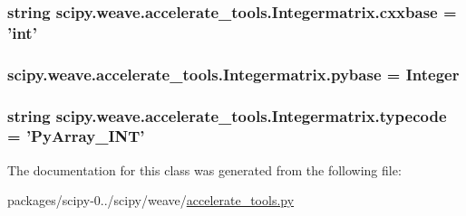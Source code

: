\subsubsection[{cxxbase}]{\setlength{\rightskip}{0pt plus 5cm}string scipy.\+weave.\+accelerate\+\_\+tools.\+Integermatrix.\+cxxbase = 'int'\hspace{0.3cm}{\ttfamily [static]}}\label{classscipy_1_1weave_1_1accelerate__tools_1_1Integermatrix_a8f944d1c9f181d47befcf39400b19428}
\hypertarget{classscipy_1_1weave_1_1accelerate__tools_1_1Integermatrix_a59d508b74495be2c8b3d72c655e1fa26}{}
\subsubsection[{pybase}]{\setlength{\rightskip}{0pt plus 5cm}scipy.\+weave.\+accelerate\+\_\+tools.\+Integermatrix.\+pybase = {\bf Integer}\hspace{0.3cm}{\ttfamily [static]}}\label{classscipy_1_1weave_1_1accelerate__tools_1_1Integermatrix_a59d508b74495be2c8b3d72c655e1fa26}
\hypertarget{classscipy_1_1weave_1_1accelerate__tools_1_1Integermatrix_ad28c0c883369f0c681dbd392a3163069}{}
\subsubsection[{typecode}]{\setlength{\rightskip}{0pt plus 5cm}string scipy.\+weave.\+accelerate\+\_\+tools.\+Integermatrix.\+typecode = 'Py\+Array\+\_\+\+I\+N\+T'\hspace{0.3cm}{\ttfamily [static]}}\label{classscipy_1_1weave_1_1accelerate__tools_1_1Integermatrix_ad28c0c883369f0c681dbd392a3163069}


The documentation for this class was generated from the following file\+:\begin{DoxyCompactItemize}
\item 
packages/scipy-\/0../scipy/weave/\hyperlink{accelerate__tools_8py}{accelerate\+\_\+tools.\+py}\end{DoxyCompactItemize}

